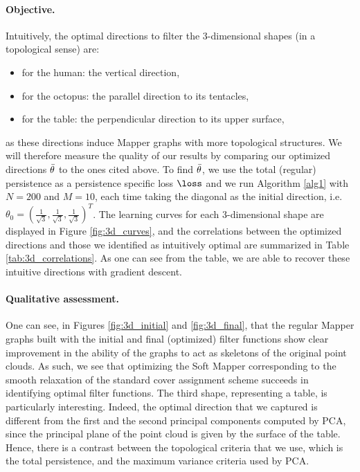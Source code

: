 \paragraph*{Objective.} Intuitively, the optimal directions to filter the 3-dimensional shapes (in a topological sense) are:
\begin{itemize}
    \item for the human: the vertical direction,
    \item for the octopus: the parallel direction to its tentacles,
    \item for the table: the perpendicular direction to its upper surface,
\end{itemize}
as these directions induce Mapper graphs with more topological structures.
We will therefore measure the quality of our results by comparing our optimized directions $\Bar{\theta}$ to the ones cited above. To find $\Bar{\theta}$, we use the total (regular) persistence as a persistence specific loss $\loss$ and we run Algorithm \ref{alg1} with $N=200$ and $M=10$, each time taking the diagonal as the initial direction, i.e. $\theta_0=(\frac{1}{\sqrt{3}},\frac{1}{\sqrt{3}},\frac{1}{\sqrt{3}})^T$.
The learning curves for each 3-dimensional shape are displayed in Figure \ref{fig:3d_curves}, and the correlations between the optimized directions and those we identified as intuitively optimal are summarized in Table \ref{tab:3d_correlations}. As one can see from the table, we are able to recover these intuitive directions with gradient descent.

\paragraph*{Qualitative assessment.} One can see, in Figures \ref{fig:3d_initial} and \ref{fig:3d_final}, that the regular Mapper graphs built with the initial and final (optimized) filter functions show clear improvement in the ability of the graphs to act as skeletons of the original point clouds. As such, we see that optimizing the Soft Mapper corresponding to the smooth relaxation of the standard cover assignment scheme succeeds in identifying optimal filter functions. The third shape, representing a table, is particularly interesting. Indeed, the optimal direction that we captured is different from the first and the second principal components computed by PCA, since the principal plane of the point cloud is given by the surface of the table. Hence, there is a contrast between the topological criteria that we use, which is the total persistence, and the maximum variance criteria used by PCA.


